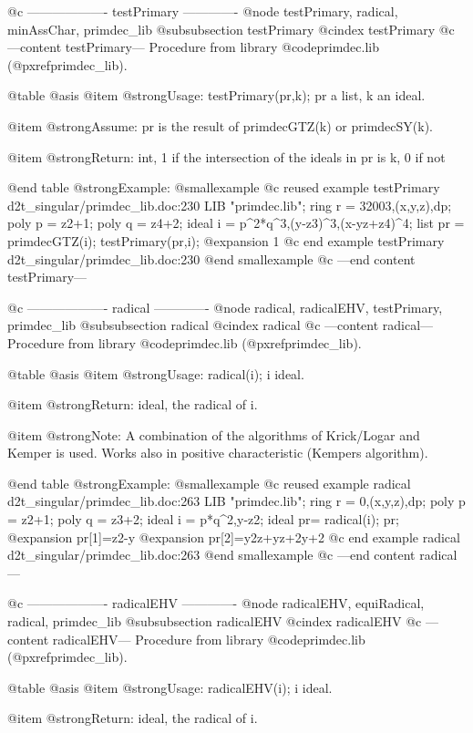 @c ------------------- testPrimary -------------
@node testPrimary, radical, minAssChar, primdec_lib
@subsubsection testPrimary
@cindex testPrimary
@c ---content testPrimary---
Procedure from library @code{primdec.lib} (@pxref{primdec_lib}).

@table @asis
@item @strong{Usage:}
testPrimary(pr,k); pr a list, k an ideal.

@item @strong{Assume:}
pr is the result of primdecGTZ(k) or primdecSY(k).

@item @strong{Return:}
int, 1 if the intersection of the ideals in pr is k, 0 if not

@end table
@strong{Example:}
@smallexample
@c reused example testPrimary d2t_singular/primdec_lib.doc:230 
LIB "primdec.lib";
ring  r = 32003,(x,y,z),dp;
poly  p = z2+1;
poly  q = z4+2;
ideal i = p^2*q^3,(y-z3)^3,(x-yz+z4)^4;
list pr = primdecGTZ(i);
testPrimary(pr,i);
@expansion{} 1
@c end example testPrimary d2t_singular/primdec_lib.doc:230
@end smallexample
@c ---end content testPrimary---

@c ------------------- radical -------------
@node radical, radicalEHV, testPrimary, primdec_lib
@subsubsection radical
@cindex radical
@c ---content radical---
Procedure from library @code{primdec.lib} (@pxref{primdec_lib}).

@table @asis
@item @strong{Usage:}
radical(i); i ideal.

@item @strong{Return:}
ideal, the radical of i.

@item @strong{Note:}
A combination of the algorithms of Krick/Logar and Kemper is used.
Works also in positive characteristic (Kempers algorithm).

@end table
@strong{Example:}
@smallexample
@c reused example radical d2t_singular/primdec_lib.doc:263 
LIB "primdec.lib";
ring  r = 0,(x,y,z),dp;
poly  p = z2+1;
poly  q = z3+2;
ideal i = p*q^2,y-z2;
ideal pr= radical(i);
pr;
@expansion{} pr[1]=z2-y
@expansion{} pr[2]=y2z+yz+2y+2
@c end example radical d2t_singular/primdec_lib.doc:263
@end smallexample
@c ---end content radical---

@c ------------------- radicalEHV -------------
@node radicalEHV, equiRadical, radical, primdec_lib
@subsubsection radicalEHV
@cindex radicalEHV
@c ---content radicalEHV---
Procedure from library @code{primdec.lib} (@pxref{primdec_lib}).

@table @asis
@item @strong{Usage:}
radicalEHV(i); i ideal.

@item @strong{Return:}
ideal, the radical of i.

